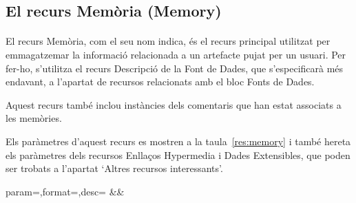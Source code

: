\subsection{El recurs Memòria (Memory)}

    \paragraph{}
    El recurs Memòria, com el seu nom indica, és el recurs principal utilitzat per emmagatzemar la informació relacionada a un artefacte pujat per un usuari. Per fer-ho, s'utilitza el recurs Descripció de la Font de Dades, que s'especificarà més endavant, a l'apartat de recursos relacionats amb el bloc Fonts de Dades.

    Aquest recurs també inclou instàncies dels comentaris que han estat associats a les memòries.

    Els paràmetres d'aquest recurs es mostren a la taula~\ref{res:memory} i també hereta els paràmetres dels recursos Enllaços Hypermedia i Dades Extensibles, que poden ser trobats a l'apartat `Altres recursos interessants'.

    \begin{center}
             {param=\param,format=\format,desc=\desc}
             {\param&\format&\desc}
     \end{center}
